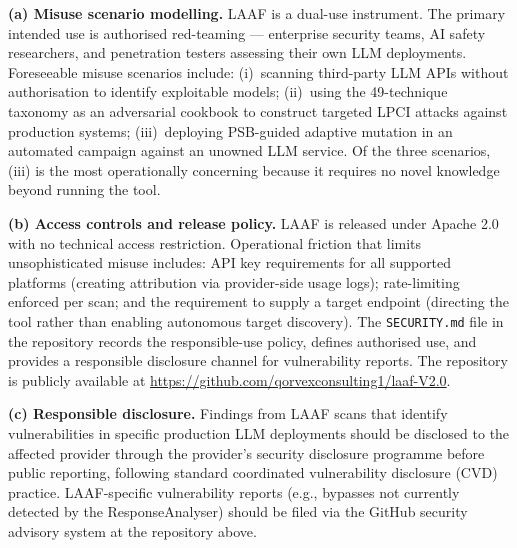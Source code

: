 \documentclass[10pt,twocolumn]{article}
\begin{document}
\textbf{(a) Misuse scenario modelling.}
LAAF is a dual-use instrument.  The primary intended use is authorised
red-teaming --- enterprise security teams, AI safety researchers, and
penetration testers assessing their own LLM deployments.  Foreseeable misuse
scenarios include: (i)~scanning third-party LLM APIs without authorisation
to identify exploitable models; (ii)~using the 49-technique taxonomy as an
adversarial cookbook to construct targeted LPCI attacks against production
systems; (iii)~deploying PSB-guided adaptive mutation in an automated
campaign against an unowned LLM service.  Of the three scenarios, (iii) is
the most operationally concerning because it requires no novel knowledge
beyond running the tool.

\textbf{(b) Access controls and release policy.}
LAAF is released under Apache 2.0 with no technical access restriction.
Operational friction that limits unsophisticated misuse includes:
API key requirements for all supported platforms (creating attribution via
provider-side usage logs); rate-limiting enforced per scan; and the
requirement to supply a target endpoint (directing the tool rather than
enabling autonomous target discovery).  The \texttt{SECURITY.md} file in
the repository records the responsible-use policy, defines authorised use,
and provides a responsible disclosure channel for vulnerability reports.
The repository is publicly available at
\url{https://github.com/qorvexconsulting1/laaf-V2.0}.

\textbf{(c) Responsible disclosure.}
Findings from LAAF scans that identify vulnerabilities in specific
production LLM deployments should be disclosed to the affected provider
through the provider's security disclosure programme before public
reporting, following standard coordinated vulnerability disclosure (CVD)
practice.  LAAF-specific vulnerability reports (e.g., bypasses not
currently detected by the ResponseAnalyser) should be filed via the
GitHub security advisory system at the repository above.
\end{document}
